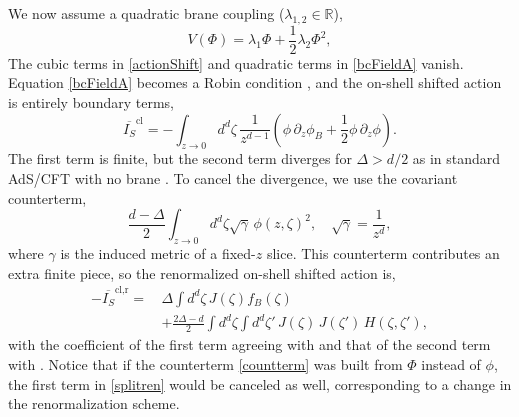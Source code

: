 \documentclass[reprint,amsmath,amssymb,aps,nofootinbib,twocolumn]{revtex4-2}
\begin{document}
We now assume a quadratic brane coupling ($\lambda_{1,2} \in \mathbb{R}$),
\begin{equation}
V(\Phi) = \lambda_1 \Phi + \frac{1}{2}\lambda_2 \Phi^2,\label{quadp}
\end{equation}
The cubic terms in \eqref{actionShift} and quadratic terms in \eqref{bcFieldA} vanish. Equation \eqref{bcFieldA} becomes a Robin condition \cite{mcavity_quantum_1993}, and the on-shell shifted action is entirely boundary terms,
\begin{equation}
\overline{I_S}^{\text{cl}} = -\int_{z\to 0} d^d\zeta\,\frac{1}{z^{d-1}}\left(\phi\,\partial_z\phi_B + \frac{1}{2}\phi\,\partial_z\phi\right).
\end{equation}
The first term is finite, but the second term diverges for $ \Delta > d\slash 2 $ as in standard AdS\slash CFT with no brane \cite{Klebanov:1999tb}. To cancel the divergence, we use the covariant counterterm,
\begin{equation}
\frac{d-\Delta}{2}\int_{z \rightarrow 0} d^{d}\zeta\sqrt{\gamma}\,\phi(z,\zeta)^{2}, \quad \sqrt{\gamma} = \frac{1}{z^{d}},
\label{countterm}
\end{equation}
where $ \gamma $ is the induced metric of a fixed-$ z $ slice. This counterterm contributes an extra finite piece, so the renormalized on-shell shifted action is,
\begin{equation}
\begin{split}
-\overline{I_S}^{\text{cl,r}}
=\,&\Delta \int d^d \zeta\,J(\zeta)f_B(\zeta)\\
&+ \frac{2\Delta - d}{2}\int d^d \zeta \int d^d\zeta'\,J(\zeta)\,J(\zeta')\,H(\zeta,\zeta'),
\end{split}
\label{splitren}
\end{equation}
with the coefficient of the first term agreeing with \cite{Almheiri:2018ijj} and that of the second term with \cite{Klebanov:1999tb}. Notice that if the counterterm \eqref{countterm} was built from $ \Phi $ instead of $ \phi $, the first term in \eqref{splitren} would be canceled as well, corresponding to a change in the renormalization scheme.
\end{document}
